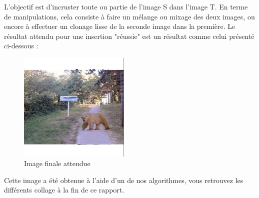 L'objectif est d'incruster toute ou partie de l'image S dans l'image T. En terme de manipulations, cela consiste à faire un mélange ou mixage des deux images, ou encore à effectuer un clonage lisse de la seconde image dans la première. Le résultat attendu pour une insertion "réussie" est un résultat comme celui présenté ci-dessous : 
    
\begin{center}
\begin{figure}[!htb]
   \centering
     \includegraphics[width = 150pt]{Annexe/OursD.png}
     \caption{Image  finale attendue}
\end{figure}
\end{center}
Cette image a été obtenue à l'aide d'un de nos algorithmes, vous retrouvez les différents collage à la fin de ce rapport.\newline
